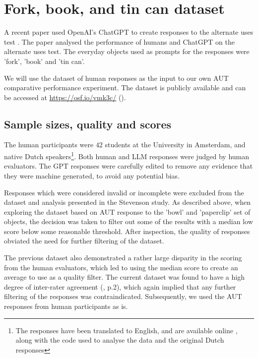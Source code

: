 \documentclass{article}
\begin{document}
\section{Fork, book, and tin can dataset}
\label{sec:fork_book_tincan}

A recent paper used OpenAI's ChatGPT to create responses to the alternate uses test \cite{stevenson2022puttinggpt3screativityalternative}. The paper analysed the performance of humans and ChatGPT on the alternate uses test. The everyday objects used as prompts for the responses were 'fork', 'book' and 'tin can'. 

We will use the dataset of human responses as the input to our own AUT comparative performance experiment. The dataset is publicly available  and can be accessed at \url{https://osf.io/vmk3c/} (\cite{stevenson2022dataset}).


\subsection{Sample sizes, quality and scores}

The human participants were $42$ students at the University in Amsterdam, and native Dutch speakers\footnote{The responses have been translated to English, and are available online \citet{stevenson2022dataset}, along with the code used to analyse the data and the original Dutch responses}. Both human and LLM responses were judged by human evaluators. The GPT responses were carefully edited to remove any evidence that they were machine generated, to avoid any potential bias. 

Responses which were considered invalid or incomplete were excluded from the dataset and analysis presented in the Stevenson study. As described above, when exploring the dataset based on AUT response to the 'bowl' and 'paperclip' set of objects, the decision was taken to filter out some of the results with a median low score below some reasonable threshold. After inspection, the quality of responses obviated the need for further filtering of the dataset. 

The previous dataset also demonstrated a rather large disparity in the scoring from the human evaluators, which led to using the median score to create an average to use as a quality filter. The current dataset was found to have a high degree of inter-rater agreement (\cite{stevenson2022puttinggpt3screativityalternative}, p.2), which again implied that any further filtering of the responses was contraindicated. Subsequently, we used the AUT responses from human participants as is.
\end{document}
